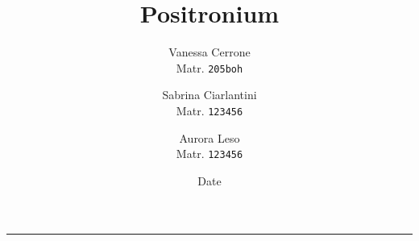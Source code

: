 

\let\origautoref\autoref
\def\autoref#1{{\origautoref{#1}}}


\def\sectionautorefname{Section}
\def\subsectionautorefname{Section}
\def\subsubsectionautorefname{Section}

\author{
  Vanessa Cerrone\\
  Matr. \texttt{205boh}
  \and
  Sabrina Ciarlantini\\
  Matr. \texttt{123456}
  \and
  Aurora Leso\\
  Matr. \texttt{123456}
}
\title{\bf{Positronium}}
\date{Date}




  \maketitle



\rule{\linewidth}{0.4pt}

